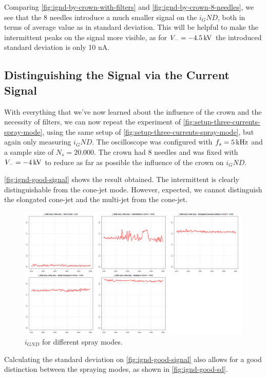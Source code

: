 \documentclass[oneside,12pt]{article}
\begin{document}
Comparing \autoref{fig:ignd-by-crown-with-filters} and \autoref{fig:ignd-by-crown-8-needles}, we see that the 8 needles introduce 
a much smaller signal on the $i_GND$, both in terms of average value as in standard deviation. This will be helpful to make  
the intermittent peaks on the signal more visible, as for $V_- = - 4.5 \,\mathrm{kV}$ the introduced standard deviation is only 10 nA.

\subsection{Distinguishing the Signal via the Current Signal}

With everything that we've now learned about the influence of the crown and the necessity of filters, we can now repeat the experiment 
of \autoref{fig:setup-three-currents-spray-mode}, using the same setup of \autoref{fig:setup-three-currents-spray-mode}, but again only
measuring $i_GND$. The oscilloscope was configured with $f_s = 5 \,\mathrm{kHz}$ and a sample size of $N_s = 20.000$. The crown had 8 needles 
and was fixed with $V_- = - 4 \,\mathrm{kV}$ to reduce as far as possible the influence of the crown on $i_GND$.

\autoref{fig:ignd-good-signal} shows the result obtained. The intermittent is clearly distinguishable from the cone-jet mode. However, 
expected, we cannot distinguish the elongated cone-jet and the multi-jet from the cone-jet.

\begin{figure}[h!]
    \centering
    \includegraphics[width=1\textwidth,trim=1 1 1 1,clip]{figures/ignd-good-signal.png}
    \caption{$i_{GND}$ for different spray modes.}
    \label{fig:ignd-good-signal}
\end{figure}

Calculating the standard deviation on \autoref{fig:ignd-good-signal} also allows for a good distinction between the spraying modes,
as shown in \autoref{fig:ignd-good-sd}.
\end{document}
